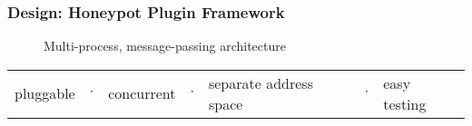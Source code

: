 \begin{frame}
\frametitle{Design: Honeypot Plugin Framework}

\begin{figure}
\centering
\caption{Multi-process, message-passing architecture}
{%
\scalebox{0.53}{}
}
\end{figure}

\begin{table}
\centering
\begin{tabular}{l l l l l l l}
pluggable & $\cdot$ & concurrent & $\cdot$ & separate address space & $\cdot$ & easy testing \\
\end{tabular}
\end{table}

\end{frame}
